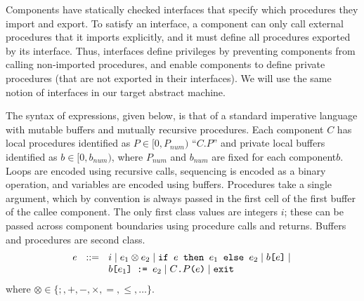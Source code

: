 \documentclass[10pt, conference, compsocconf, letterpaper, times]{IEEEtran}
\begin{document}
Components have statically checked interfaces that specify which
procedures they import and export.
To satisfy an interface, a component can only call external procedures
that it imports explicitly, and it must define all procedures exported
by its interface.
Thus, interfaces define privileges by preventing components from
calling non-imported procedures, and enable components to define
private procedures (that are not exported in their interfaces).
We will use the same notion of interfaces in our target abstract machine.

The syntax of expressions, given below, is that of a standard
imperative language with mutable buffers and mutually recursive
procedures.  Each component $C$ has local procedures \iffull
identified as $P \in [0, P_{num})$ \else ``$C.P$'' \fi and private
local buffers \iffull identified as $b \in [0,b_{num})$, where
$P_{num}$ and $b_{num}$ are fixed for each component\else $b$\fi{}.
Loops are encoded using recursive calls, sequencing is encoded as a
binary operation, and variables are encoded using buffers.  Procedures
take a single argument, which by convention is always passed in the
first cell of the first buffer of the callee component.  The only
first class values are integers $i$; these can be passed across
component boundaries using procedure calls and returns.  Buffers and
procedures are second class.
\[
\begin{array}{l@{}l}
  \mathit{e} \ \ \mathrel{::=}\ \  \;&
    i
    \;|\;
    e_1 \otimes e_2
    \;|\;
    \texttt{if }e\texttt{ then }e_1\texttt{ else }e_2
    \;|\;
    b\texttt{[}e\texttt{]}
    \;|\;
  \\  &
    b\texttt{[}e_1\texttt{] := }e_2
    \;|\;
    C\texttt{.}P\texttt{(}e\texttt{)}
    \;|\;
    \texttt{exit}
\end{array}
\]
where $\otimes \in \{ ; , + , - , \times, =, \leq, \ldots\}$.
\end{document}
